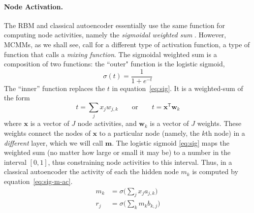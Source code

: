 \paragraph{Node Activation.} The RBM and classical autoencoder essentially use the same function for computing node activities, namely the \emph{sigmoidal weighted sum} \citep{hinton:1987trans, hinton-and-salak:2006}.
However, MCMMs, as we shall see, call for a different type of activation function, a type of function that \citet{saund:94} calls a \emph{mixing function}.
The sigmoidal weighted sum is a composition of two functions: the ``outer" function is the logistic sigmoid, 
	\begin{equation} %
	\label{eq:sig}
	\sigma(t) = \frac{1}{1 + e^{-t}} 
	\end{equation} %
The ``inner'' function replaces the $t$ in equation~\eqref{eq:sig}. It is a weighted-sum of the form 
\begin{equation} \label{eq:wtd-sum}
t = \sum_{j} x_{j} w_{j,k} \qquad  \text{or} \qquad t = \textbf{x}^{\textsf{T}}\textbf{w}_k
\end{equation}
where $\textbf{x}$ is a vector of $J$ node activities, and $\textbf{w}_k$ is a vector of $J$ weights. These weights connect the nodes of $\textbf{x}$ to a particular node (namely, the $k$th node) in a \emph{different} layer, which we will call $\textbf{m}$. 
The logistic sigmoid \eqref{eq:sig} maps the weighted sum (no matter how large or small it may be) to a number in the interval $[0,1]$, thus constraining node activities to this interval.
Thus, in a classical autoencoder the activity of each the hidden node $m_k$ is computed by equation~\eqref{eq:sig-m-ac}. 
\begin{align}
\label{eq:sig-m-ac}
m_{k} &= \sigma\big(\sum_{j} x_{j} a_{j,k}\big) \\
\label{eq:sig-r-ac}
r_{j} &= \sigma\big(\sum_{k}  m_{k} b_{k,j} \big)
\end{align}
